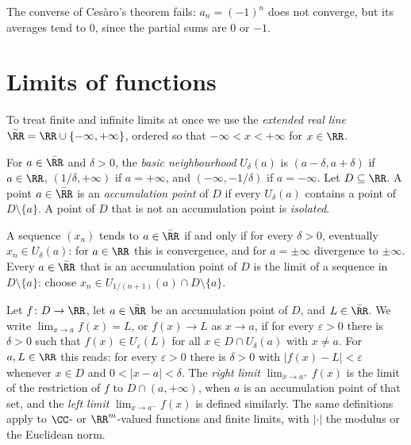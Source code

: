 \begin{counterexample}\label{real-analysis:counterexample-cesaro-converse}
The converse of Ces\`aro's theorem fails: $a_n = (-1)^n$ does not converge, but its averages tend to $0$, since the partial sums are $0$ or $-1$.
\end{counterexample}

\section{Limits of functions}\label{real-analysis:section-limits-functions}

To treat finite and infinite limits at once we use the \emph{extended real line} $\bar{\RR} = \RR \cup \{-\infty, +\infty\}$, ordered so that $-\infty < x < +\infty$ for $x \in \RR$.

\begin{definition}\label{real-analysis:definition-neighbourhoods}
For $a \in \bar{\RR}$ and $\delta > 0$, the \emph{basic neighbourhood} $U_\delta(a)$ is $(a - \delta, a + \delta)$ if $a \in \RR$, $(1/\delta, +\infty)$ if $a = +\infty$, and $(-\infty, -1/\delta)$ if $a = -\infty$. Let
$D \subseteq \RR$. A point $a \in \bar{\RR}$ is an \emph{accumulation point} of $D$ if every $U_\delta(a)$ contains a point of $D \setminus \{a\}$. A point of $D$ that is not an accumulation point is \emph{isolated}.
\end{definition}

A sequence $(x_n)$ tends to $a \in \bar{\RR}$ if and only if for every $\delta > 0$, eventually $x_n \in U_\delta(a)$: for $a \in \RR$ this is convergence, and for $a = \pm\infty$ divergence to $\pm\infty$. Every $a \in \bar{\RR}$
that is an accumulation point of $D$ is the limit of a sequence in $D \setminus \{a\}$: choose $x_n \in U_{1/(n+1)}(a) \cap D \setminus \{a\}$.

\begin{definition}\label{real-analysis:definition-function-limit}
Let $f \colon D \to \RR$, let $a \in \bar{\RR}$ be an accumulation point of $D$, and $L \in \bar{\RR}$. We write $\lim_{x \to a}f(x) = L$, or $f(x) \to L$ as $x \to a$, if for every $\varepsilon > 0$ there is $\delta > 0$ such that
$f(x) \in U_\varepsilon(L)$ for all $x \in D \cap U_\delta(a)$ with $x \neq a$. For $a, L \in \RR$ this reads: for every $\varepsilon > 0$ there is $\delta > 0$ with $|f(x) - L| < \varepsilon$ whenever $x \in D$ and
$0 < |x - a| < \delta$. The \emph{right limit} $\lim_{x \to a^+}f(x)$ is the limit of the restriction of $f$ to $D \cap (a, +\infty)$, when $a$ is an accumulation point of that set, and the \emph{left limit}
$\lim_{x \to a^-}f(x)$ is defined similarly. The same definitions apply to $\CC$- or $\RR^m$-valued functions and finite limits, with $|\cdot|$ the modulus or the Euclidean norm.
\end{definition}

